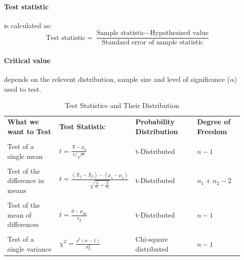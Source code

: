\paragraph{Test statistic} %
\label{par:Test statistic}
is calculated as:
$$
	\text{Test statistic} = \frac{\text{Sample statistic} - \text{Hypothesized value}}{\text{Standard error of sample statistic}}
$$
\paragraph{Critical value} %
\label{par:Critical value}
depends on the relevent distribution, sample size and level of significance ($\alpha$) used to test.
\begin{table}[h!]
	\caption{Test Statistics and Their Distribution}
	\begin{center}
		\label{tab:TestStat and Distribution}
		\begin{tabular}{p{0.23\linewidth} p{0.25\linewidth} p{0.27\linewidth} p{0.2\linewidth}}
			\toprule
			\textbf{What we want to Test}           & \textbf{Test Statistic}                                                                                                & \textbf{Probability Distribution} & \textbf{Degree of Freedom} \\                                                                                                                          \\
			\toprule
			Test of a single mean                   & $t = \displaystyle \frac{\overline{X}-\mu_0}{s/\sqrt{n}}$                                                            & t-Distributed                     & $n-1$                      \\
			\\
			Test of the difference in means         & $t = \displaystyle \frac{(\overline{X}_1-\overline{X}_2)-(\mu_1-\mu_2)}{\sqrt{\displaystyle \frac{s^2_p}{n_1}+\frac{s^2_p}{n_2}}}$ & t-Distributed                     & $n_1+n_2-2$                \\
			\\
			Test of the mean of differences         & $t = \displaystyle \frac{\overline{d}-\mu_{d0}}{s_{\overline{d}}}$                                                   & t-Distributed                     & $n-1$                      \\
			\\
			Test of a single variance               & $\chi^2 = \displaystyle \frac{s^2(n-1)}{\sigma^2_0}$                                                                 & Chi-square distributed            & $n-1$                      \\

\end{tabular}
\end{center}
\end{table}
